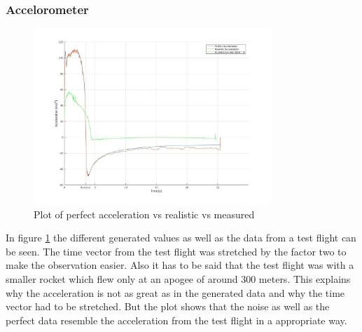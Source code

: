 \subsubsection{Accelorometer}
\begin{figure}[h!]
 \centering
 \includegraphics[width=0.8\textwidth]{./Pictures/AccelPerfVSReal.jpg}
 \caption{Plot of perfect acceleration vs realistic vs measured}
 \label{fig:AccelPerfVsReal}
\end{figure}
In figure \ref{fig:AccelPerfVsReal} the different generated values as well as the data from a test flight can be seen.
The time vector from the test flight was stretched by the factor two to make the observation easier.
Also it has to be said that the test flight was with a smaller rocket which flew only at an apogee of around 300 meters.
This explains why the acceleration is not as great as in the generated data and why the time vector had to be stretched.
But the plot shows that the noise as well as the perfect data resemble the acceleration from the test flight in a appropriate way.

\newpage
